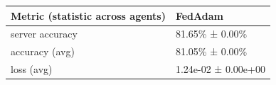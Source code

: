 \begin{tabular}{ll}
\hline
 Metric (statistic across agents)   & FedAdam             \\
\hline
 server accuracy                    & 81.65\% ± 0.00\%      \\
 accuracy (avg)                     & 81.05\% ± 0.00\%      \\
 loss (avg)                         & 1.24e-02 ± 0.00e+00 \\
\hline
\end{tabular}